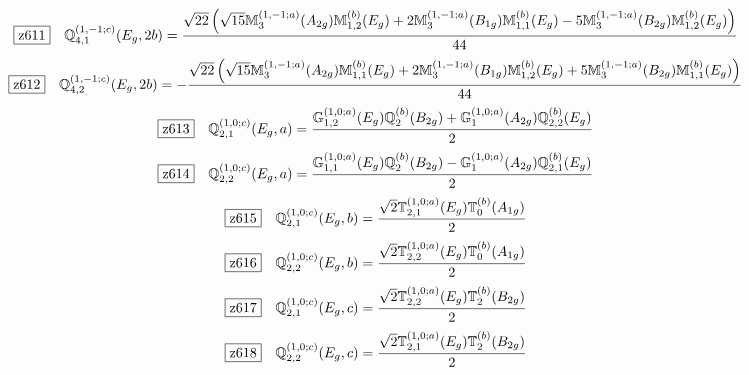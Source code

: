 \documentclass[fleqn,10pt,landscape]{jsarticle}
\begin{document}
\begin{dmath*}
\hspace*{3mm}\fbox{z611}\quad \mathbb{Q}_{4,1}^{(1,-1;c)}(E_{g},2b)=\frac{\sqrt{22} \left(\sqrt{15} \mathbb{M}_{3}^{(1,-1;a)}(A_{2g}) \mathbb{M}_{1,2}^{(b)}(E_{g}) + 2 \mathbb{M}_{3}^{(1,-1;a)}(B_{1g}) \mathbb{M}_{1,1}^{(b)}(E_{g}) - 5 \mathbb{M}_{3}^{(1,-1;a)}(B_{2g}) \mathbb{M}_{1,2}^{(b)}(E_{g})\right)}{44}
\end{dmath*}
\begin{dmath*}
\hspace*{3mm}\fbox{z612}\quad \mathbb{Q}_{4,2}^{(1,-1;c)}(E_{g},2b)=- \frac{\sqrt{22} \left(\sqrt{15} \mathbb{M}_{3}^{(1,-1;a)}(A_{2g}) \mathbb{M}_{1,1}^{(b)}(E_{g}) + 2 \mathbb{M}_{3}^{(1,-1;a)}(B_{1g}) \mathbb{M}_{1,2}^{(b)}(E_{g}) + 5 \mathbb{M}_{3}^{(1,-1;a)}(B_{2g}) \mathbb{M}_{1,1}^{(b)}(E_{g})\right)}{44}
\end{dmath*}
\begin{dmath*}
\hspace*{3mm}\fbox{z613}\quad \mathbb{Q}_{2,1}^{(1,0;c)}(E_{g},a)=\frac{\mathbb{G}_{1,2}^{(1,0;a)}(E_{g}) \mathbb{Q}_{2}^{(b)}(B_{2g}) + \mathbb{G}_{1}^{(1,0;a)}(A_{2g}) \mathbb{Q}_{2,2}^{(b)}(E_{g})}{2}
\end{dmath*}
\begin{dmath*}
\hspace*{3mm}\fbox{z614}\quad \mathbb{Q}_{2,2}^{(1,0;c)}(E_{g},a)=\frac{\mathbb{G}_{1,1}^{(1,0;a)}(E_{g}) \mathbb{Q}_{2}^{(b)}(B_{2g}) - \mathbb{G}_{1}^{(1,0;a)}(A_{2g}) \mathbb{Q}_{2,1}^{(b)}(E_{g})}{2}
\end{dmath*}
\begin{dmath*}
\hspace*{3mm}\fbox{z615}\quad \mathbb{Q}_{2,1}^{(1,0;c)}(E_{g},b)=\frac{\sqrt{2} \mathbb{T}_{2,1}^{(1,0;a)}(E_{g}) \mathbb{T}_{0}^{(b)}(A_{1g})}{2}
\end{dmath*}
\begin{dmath*}
\hspace*{3mm}\fbox{z616}\quad \mathbb{Q}_{2,2}^{(1,0;c)}(E_{g},b)=\frac{\sqrt{2} \mathbb{T}_{2,2}^{(1,0;a)}(E_{g}) \mathbb{T}_{0}^{(b)}(A_{1g})}{2}
\end{dmath*}
\begin{dmath*}
\hspace*{3mm}\fbox{z617}\quad \mathbb{Q}_{2,1}^{(1,0;c)}(E_{g},c)=\frac{\sqrt{2} \mathbb{T}_{2,2}^{(1,0;a)}(E_{g}) \mathbb{T}_{2}^{(b)}(B_{2g})}{2}
\end{dmath*}
\begin{dmath*}
\hspace*{3mm}\fbox{z618}\quad \mathbb{Q}_{2,2}^{(1,0;c)}(E_{g},c)=\frac{\sqrt{2} \mathbb{T}_{2,1}^{(1,0;a)}(E_{g}) \mathbb{T}_{2}^{(b)}(B_{2g})}{2}
\end{dmath*}
\end{document}
